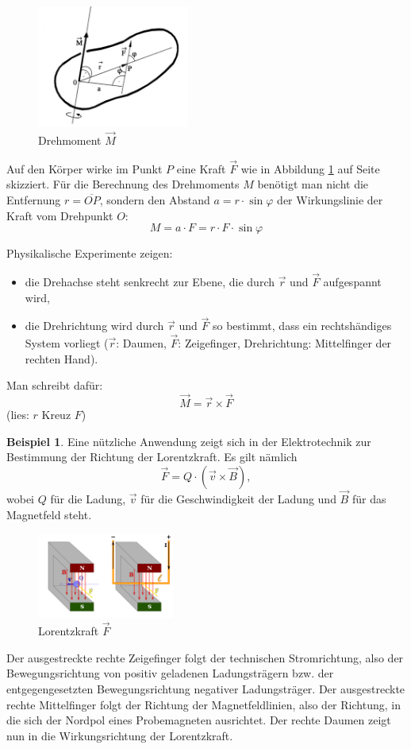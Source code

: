 \documentclass[%
11pt,%
twoside,%
titlepage,%
<<<<<<< Updated upstream
german,%
=======
swissgerman,%
>>>>>>> Stashed changes
headsepline%
]{scrartcl}
\theoremstyle{definition}
\newtheorem{bsp}{Beispiel}[subsection] %
\theoremstyle{plain}
\begin{document}
\begin{figure}[ht]
\begin{center}
\includegraphics[width=5cm]{pictures/vprodukt}
\end{center}
\caption{Drehmoment $\vec{M}$}\label{abb:vektorprod}
\end{figure}

Auf den Körper wirke im Punkt $P$ eine Kraft $\vec{F}$ wie in Abbildung \ref{abb:vektorprod} auf Seite \pageref{abb:vektorprod} skizziert. Für die Berechnung des Drehmoments $M$ benötigt man nicht die Entfernung $r =\overline{OP}$, sondern den Abstand $a =r\cdot\sin\varphi$ der Wirkungslinie der Kraft vom Drehpunkt $O$:
$$M =a\cdot F =r\cdot F\cdot \sin\varphi$$

Physikalische Experimente zeigen:
\begin{itemize}
\item die Drehachse steht senkrecht zur Ebene, die durch
$\vec{r}$ und $\vec{F}$ aufgespannt wird,
\item die Drehrichtung wird durch $\vec{r}$ und $\vec{F}$ so bestimmt,
dass ein rechtshändiges System vorliegt ($\vec{r}$: Daumen,
$\vec{F}$: Zeigefinger, Drehrichtung: Mittelfinger der rechten Hand).
\end{itemize}
Man schreibt dafür:
$$\vec{M}=\vec{r}\times\vec{F}$$
(lies: \glqq $r$ Kreuz $F$\grqq)

\begin{bsp}
Eine nützliche Anwendung zeigt sich in der Elektrotechnik zur Bestimmung der Richtung der Lorentzkraft. Es gilt nämlich
$$\vec{F}=Q\cdot(\vec{v}\times\vec{B}),$$
wobei $Q$ für die Ladung, $\vec{v}$ für die Geschwindigkeit der Ladung und $\vec{B}$ für das Magnetfeld steht.
\begin{figure}
\begin{center}
\includegraphics[width=0.4\textwidth]{pictures/lorentz.png}
\caption{Lorentzkraft $\vec{F}$}
\end{center}
\end{figure}
Der ausgestreckte rechte Zeigefinger folgt der technischen Stromrichtung, also der Bewegungsrichtung von positiv geladenen Ladungsträgern bzw. der entgegengesetzten Bewegungsrichtung negativer Ladungsträger.
Der ausgestreckte rechte Mittelfinger folgt der Richtung der Magnetfeldlinien, also der Richtung, in die sich der Nordpol eines Probemagneten ausrichtet.
Der rechte Daumen zeigt nun in die Wirkungsrichtung der Lorentzkraft.
\end{bsp}

\cleardoublepage

\listoffigures
\end{document}
